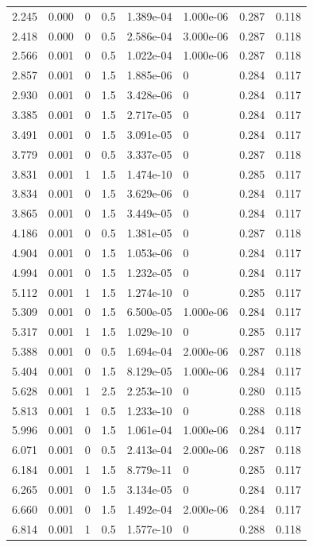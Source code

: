 \documentclass[preview]{standalone}
\begin{document}
{{\begin{tabular}{L{1.2cm}C{1.2cm} C{0.3cm}C{0.5cm} C{1.4cm}C{1.4cm} C{1.4cm}C{1.4cm}}
  2.245  &  0.000  & 0     & 0.5 &  1.389e-04  & 1.000e-06  & 0.287 &  0.118   \\ 
  2.418  &  0.000  & 0     & 0.5 &  2.586e-04  & 3.000e-06  & 0.287 &  0.118   \\ 
  2.566  &  0.001  & 0     & 0.5 &  1.022e-04  & 1.000e-06  & 0.287 &  0.118   \\ 
  2.857  &  0.001  & 0     & 1.5 &  1.885e-06  & 0  & 0.284 &  0.117   \\ 
  2.930  &  0.001  & 0     & 1.5 &  3.428e-06  & 0  & 0.284 &  0.117   \\ 
  3.385  &  0.001  & 0     & 1.5 &  2.717e-05  & 0  & 0.284 &  0.117   \\ 
  3.491  &  0.001  & 0     & 1.5 &  3.091e-05  & 0  & 0.284 &  0.117   \\ 
  3.779  &  0.001  & 0     & 0.5 &  3.337e-05  & 0  & 0.287 &  0.118   \\ 
  3.831  &  0.001  & 1     & 1.5 &  1.474e-10  & 0  & 0.285 &  0.117   \\ 
  3.834  &  0.001  & 0     & 1.5 &  3.629e-06  & 0  & 0.284 &  0.117   \\ 
  3.865  &  0.001  & 0     & 1.5 &  3.449e-05  & 0  & 0.284 &  0.117   \\ 
  4.186  &  0.001  & 0     & 0.5 &  1.381e-05  & 0  & 0.287 &  0.118   \\ 
  4.904  &  0.001  & 0     & 1.5 &  1.053e-06  & 0  & 0.284 &  0.117   \\ 
  4.994  &  0.001  & 0     & 1.5 &  1.232e-05  & 0  & 0.284 &  0.117   \\ 
  5.112  &  0.001  & 1     & 1.5 &  1.274e-10  & 0  & 0.285 &  0.117   \\ 
  5.309  &  0.001  & 0     & 1.5 &  6.500e-05  & 1.000e-06  & 0.284 &  0.117   \\ 
  5.317  &  0.001  & 1     & 1.5 &  1.029e-10  & 0  & 0.285 &  0.117   \\ 
  5.388  &  0.001  & 0     & 0.5 &  1.694e-04  & 2.000e-06  & 0.287 &  0.118   \\ 
  5.404  &  0.001  & 0     & 1.5 &  8.129e-05  & 1.000e-06  & 0.284 &  0.117   \\ 
  5.628  &  0.001  & 1     & 2.5 &  2.253e-10  & 0  & 0.280 &  0.115   \\ 
  5.813  &  0.001  & 1     & 0.5 &  1.233e-10  & 0  & 0.288 &  0.118   \\ 
  5.996  &  0.001  & 0     & 1.5 &  1.061e-04  & 1.000e-06  & 0.284 &  0.117   \\ 
  6.071  &  0.001  & 0     & 0.5 &  2.413e-04  & 2.000e-06  & 0.287 &  0.118   \\ 
  6.184  &  0.001  & 1     & 1.5 &  8.779e-11  & 0  & 0.285 &  0.117   \\ 
  6.265  &  0.001  & 0     & 1.5 &  3.134e-05  & 0  & 0.284 &  0.117   \\ 
  6.660  &  0.001  & 0     & 1.5 &  1.492e-04  & 2.000e-06  & 0.284 &  0.117   \\ 
  6.814  &  0.001  & 1     & 0.5 &  1.577e-10  & 0  & 0.288 &  0.118   \\ 
\hline 
\end{tabular} 

}}
\end{document}
